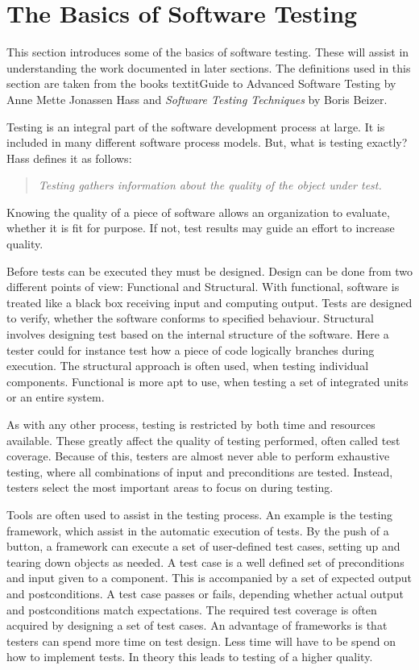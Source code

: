 \section{The Basics of Software Testing}\label{sect:btesting}
This section introduces some of the basics of software testing. These will assist in understanding the work documented in later sections. The definitions used in this section are taken from the books textit{Guide to Advanced Software Testing} by Anne Mette Jonassen Hass\cite{Hass} and \textit{Software Testing Techniques} by Boris Beizer\cite{Beizer}.

Testing is an integral part of the software development process at large. It is included in many different software process models. But, what is testing exactly? Hass defines it as follows: 
 \begin{quotation} \textit{Testing gathers information about the quality of the object under test.}\end{quotation}  
Knowing the quality of a piece of software allows an organization to evaluate, whether it is fit for purpose. If not, test results may guide an effort to increase quality.

Before tests can be executed they must be designed.  Design can be done from two different points of view: Functional and Structural. With functional, software is treated like a black box receiving input and computing output. Tests are designed to verify, whether the software conforms to specified behaviour. Structural involves designing test based on the internal structure of the software. Here a tester could for instance test how a piece of code logically branches during execution. The structural approach is often used, when testing individual components. Functional is more apt to use, when testing a set of integrated units or an entire system. 

As with any other process, testing is restricted by both time and resources available. These greatly affect the quality of testing performed, often called test coverage. Because of this, testers are almost never able to perform exhaustive testing, where all combinations of input and preconditions are tested. Instead, testers select the most important areas to focus on during testing.  

Tools are often used to assist in the testing process. An example is the testing framework, which assist in the automatic execution of tests. By the push of a button, a framework can execute a set of user-defined test cases, setting up and tearing down objects as needed. A test case is a well defined set of preconditions and input given to a component. This is  accompanied by a set of expected output and postconditions. A test case passes or fails, depending whether actual output and postconditions match expectations.  The required test coverage is often acquired by designing a set of test cases. An advantage of frameworks is that testers can spend more time on test design. Less time will have to be spend on how to implement tests. In theory this leads to testing of a higher quality.

